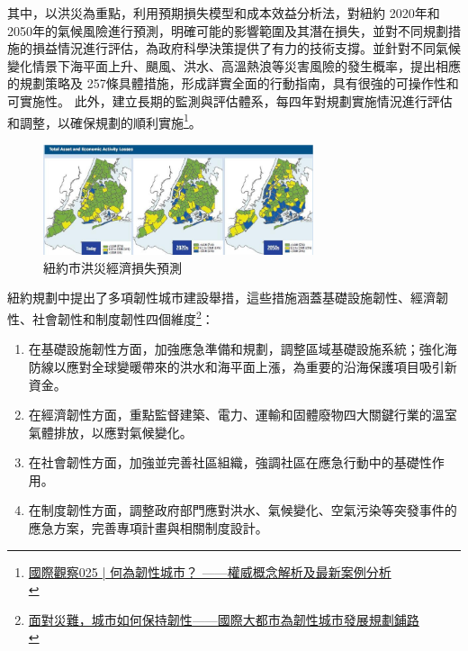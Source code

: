 \documentclass[a4paper,12pt]{article}
\begin{document}
\begin{enumerate}
\begin{enumerate}
其中，以洪災為重點，利用預期損失模型和成本效益分析法，對紐約 2020年和2050年的氣候風險進行預測，明確可能的影響範圍及其潛在損失，並對不同規劃措施的損益情況進行評估，為政府科學決策提供了有力的技術支撐。並針對不同氣候變化情景下海平面上升、颶風、洪水、高溫熱浪等災害風險的發生概率，提出相應的規劃策略及 257條具體措施，形成詳實全面的行動指南，具有很強的可操作性和可實施性。 此外，建立長期的監測與評估體系，每四年對規劃實施情況進行評估和調整，以確保規劃的順利實施\footnote{\href{https://www.google.com/url?sa=t\&rct=j\&q=\&esrc=s\&source=web\&cd=\&cad=rja\&uact=8\&ved=2ahUKEwiMp83GrsPvAhUGVpQKHQ5OAb8QFjABegQIAhAD\&url=http\%3A\%2F\%2Fread01.com\%2Fzh-tw\%2FNyB3R3Q.html\&usg=AOvVaw0q41fGXsI96FVJ784m4j7M}{國際觀察025  | 何為韌性城市？  ——權威概念解析及最新案例分析}\\}。\\

\begin{figure}[htbp]
\centering
\includegraphics[width=300]{images/ny1.png}
\caption{\label{fig:NY-1}紐約市洪災經濟損失預測}
\end{figure}

紐約規劃中提出了多項韌性城市建設舉措，這些措施涵蓋基礎設施韌性、經濟韌性、社會韌性和制度韌性四個維度\footnote{\href{https://news.gmw.cn/2020-04/09/content\_33725150.htm}{面對災難，城市如何保持韌性——國際大都市為韌性城市發展規劃鋪路}\\}：\\
\begin{enumerate}
\item 在基礎設施韌性方面，加強應急準備和規劃，調整區域基礎設施系統；強化海防線以應對全球變暖帶來的洪水和海平面上漲，為重要的沿海保護項目吸引新資金。\\
\item 在經濟韌性方面，重點監督建築、電力、運輸和固體廢物四大關鍵行業的溫室氣體排放，以應對氣候變化。\\
\item 在社會韌性方面，加強並完善社區組織，強調社區在應急行動中的基礎性作用。\\
\item 在制度韌性方面，調整政府部門應對洪水、氣候變化、空氣污染等突發事件的應急方案，完善專項計畫與相關制度設計。\\
\end{enumerate}
\end{enumerate}


\end{enumerate}
\end{document}
